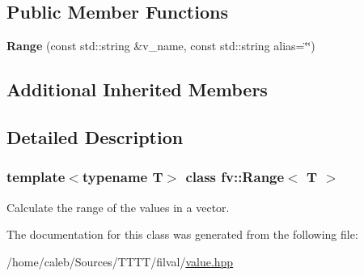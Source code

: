 \subsection*{Public Member Functions}
\begin{DoxyCompactItemize}
\item 
\hypertarget{classfv_1_1Range_ad9fe37f4747fede413d98ca0bac045f0}{}\label{classfv_1_1Range_ad9fe37f4747fede413d98ca0bac045f0} 
{\bfseries Range} (const std\+::string \&v\+\_\+name, const std\+::string alias=\char`\"{}\char`\"{})
\end{DoxyCompactItemize}
\subsection*{Additional Inherited Members}


\subsection{Detailed Description}
\subsubsection*{template$<$typename T$>$\newline
class fv\+::\+Range$<$ T $>$}

Calculate the range of the values in a vector. 

The documentation for this class was generated from the following file\+:\begin{DoxyCompactItemize}
\item 
/home/caleb/\+Sources/\+T\+T\+T\+T/filval/\hyperlink{value_8hpp}{value.\+hpp}\end{DoxyCompactItemize}
